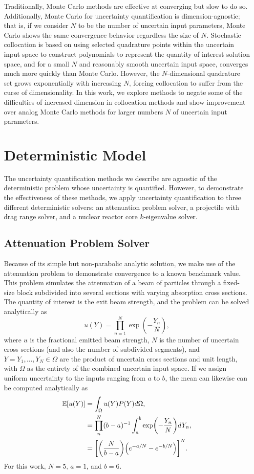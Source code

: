 \documentclass{mc2015}
\newcommand{\expv}[1]{\ensuremath{\mathbb{E}[ #1]}}
\begin{document}
Traditionally, Monte Carlo methods are effective at converging but slow to do so.  Additionally, Monte Carlo for uncertainty quantification is dimension-agnostic; that is, if we consider $N$ to be the number of uncertain input parameters, Monte Carlo shows the same convergence behavior regardless the size of $N$.  Stochastic collocation is based on using selected quadrature points within the uncertain input space to construct polynomials to represent the quantity of interest solution space, and for a small $N$ and reasonably smooth uncertain input space, converges much more quickly than Monte Carlo.  However, the $N$-dimensional quadrature set grows exponentially with increasing $N$, forcing collocation to suffer from the curse of dimensionality.  In this work, we explore methods to negate some of the difficulties of increased dimension in collocation methods and show improvement over analog Monte Carlo methods for larger numbers $N$ of uncertain input parameters.

\section{Deterministic Model}
The uncertainty quantification methods we describe are agnostic of the deterministic problem whose uncertainty is quantified.  However, to demonstrate the effectiveness of these methods, we apply uncertainty quantification to three different deterministic solvers: an attenuation problem solver, a projectile with drag range solver, and a nuclear reactor core $k$-eigenvalue solver.

\subsection{Attenuation Problem Solver}
Because of its simple but non-parabolic analytic solution, we make use of the attenuation problem to demonstrate convergence to a known benchmark value.  This problem simulates the attenuation of a beam of particles through a fixed-size block subdivided into several sections with varying absorption cross sections.  The quantity of interest is the exit beam strength, and the problem can be solved analytically as
\begin{equation}
u(Y) = \prod_{n=1}^N \exp(-\frac{Y_n}{N}),
\end{equation}
where $u$ is the fractional emitted beam strength, $N$ is the number of uncertain cross sections (and also the number of subdivided segments), and $Y={Y_1,\ldots,Y_N}\in\Omega$ are the product of uncertain cross sections and unit length, with $\Omega$ as the entirety of the combined uncertain input space.  If we assign uniform uncertainty to the inputs ranging from $a$ to $b$, the mean can likewise can be computed analytically as
\begin{align}
\expv{u(Y)}&=\int_\Omega u(Y)P(Y) d\Omega,\\
    &=\prod_n^N (b-a)^{-1}\int_a^b \exp(-\frac{Y_n}{N}) dY_n,\\
    &=\qty[\qty(\frac{N}{b-a})\qty(e^{-a/N}-e^{-b/N})]^N.
\end{align}
For this work, $N=5$, $a=1$, and $b=6$.
\end{document}
